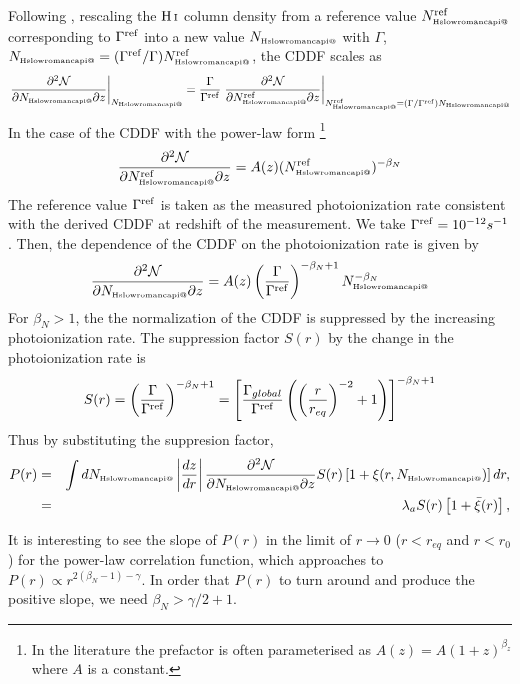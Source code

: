 \documentclass[useAMS,usenatbib,twocolumn]{mn2e}
\makeatletter
\newcommand{\HI}{{\rm H\,{\scriptstyle I}}}
\newcommand{\Rmnum}[1]{\expandafter\@slowromancap\romannumeral #1@}
\newcommand{\NHI}{N_{\mbox{\tiny H\Rmnum{1}}}}
\makeatother
\begin{document}
Following \cite{1997ApJ...486..599H}, rescaling the $\HI$ column density from
a reference value $\NHI^{\rm{ref}}$ corresponding to $\Gamma^{\rm{ref}}$ 
into a new value $\NHI$ with $\Gamma$, $\NHI=(\Gamma^{{\rm{ref}}}/\Gamma)
\NHI^{{\rm{ref}}}$, the CDDF scales as
\begin{equation}
\left.\frac{\partial^2\mathcal{N}}{\partial\NHI\partial z}\right|_{\NHI}=
\frac{\Gamma}{\Gamma^{\rm{ref}}}
\left.\frac{\partial^2\mathcal{N}}{\partial\NHI^{\rm{ref}}\partial z}
\right|_{\NHI^{\rm{ref}}=(\Gamma/\Gamma^{\rm{ref}})\NHI}
\end{equation}
In the case of the CDDF with the power-law form
\footnote{In the literature the prefactor is often parameterised as
$A(z)=A(1+z)^{\beta_z}$ where $A$ is a constant.}
\begin{equation}
\frac{\partial^2\mathcal{N}}{\partial\NHI^{\rm{ref}}\partial z}
=A(z)(\NHI^{\rm{ref}})^{-\beta_N}
\end{equation}
The reference value $\Gamma^{\rm{ref}}$ is taken as the measured photoionization 
rate consistent with the derived CDDF at redshift of the measurement.
We take $\Gamma^{\rm{ref}}=10^{-12}s^{-1}$. Then, the dependence of the CDDF
on the photoionization rate is given by
\begin{equation}
\frac{\partial^2\mathcal{N}}{\partial\NHI\partial z}
=A(z)\left(\frac{\Gamma}{\Gamma^{\rm{ref}}}\right)^{-\beta_N+1}\NHI^{-\beta_N}
\end{equation}
For $\beta_N>1$, the the normalization of the CDDF is suppressed by the 
increasing photoionization rate. The suppression factor $S(r)$ by
the change in the photoionization rate is
\begin{equation}
S(r)=\left(\frac{\Gamma}{\Gamma^{\rm{ref}}}\right)^{-\beta_N+1}
=\left[\frac{\Gamma_{global}}{\Gamma^{\rm{ref}}}\left(
\left(\frac{r}{r_{eq}}\right)^{-2}+1\right)\right]^{-\beta_N+1}
\end{equation}
Thus by substituting the suppresion factor,
\begin{eqnarray}
P(r)&=&\int d\NHI\left|\frac{dz}{dr}\right|
\frac{\partial^2\mathcal{N}}{\partial\NHI \partial z}S(r)
\left[1+\xi(r,\NHI)\right]dr, \nonumber \\
&=&\lambda_aS(r)\left[1+\bar{\xi}(r)\right],
\end{eqnarray}

It is interesting to see the slope of $P(r)$ in the limit of 
$r\rightarrow0$ ($r<r_{eq}$ and $r<r_0$) for the power-law correlation
function, which approaches to $P(r)\propto r^{2(\beta_N-1)-\gamma}$. In order that
$P(r)$ to turn around and produce the positive slope, 
we need $\beta_N>\gamma/2+1$.
\end{document}
